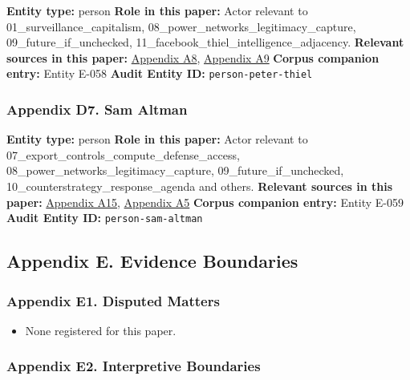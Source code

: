 \documentclass[
  american,
  11pt,
  letterpaper,
]{article}
\providecommand{\tightlist}{%
  \setlength{\itemsep}{0pt}\setlength{\parskip}{0pt}}
\begin{document}
\textbf{Entity type:} person \textbf{Role in this paper:} Actor relevant
to 01\_surveillance\_capitalism,
08\_power\_networks\_legitimacy\_capture, 09\_future\_if\_unchecked,
11\_facebook\_thiel\_intelligence\_adjacency. \textbf{Relevant sources
in this paper:}
\hyperref[appendix-a8-why-silicon-valley-billionaires-are-prepping-for-the-apocalypse-in-new-zealand]{Appendix
A8},
\hyperref[appendix-a9-new-zealand-woos-the-wealthy-with-golden-visa-changes]{Appendix
A9} \textbf{Corpus companion entry:} Entity E-058 \textbf{Audit Entity
ID:} \texttt{person-peter-thiel}

\subsubsection{Appendix D7. Sam Altman}\label{appendix-d7-sam-altman}

\textbf{Entity type:} person \textbf{Role in this paper:} Actor relevant
to 07\_export\_controls\_compute\_defense\_access,
08\_power\_networks\_legitimacy\_capture, 09\_future\_if\_unchecked,
10\_counterstrategy\_response\_agenda and others. \textbf{Relevant
sources in this paper:}
\hyperref[appendix-a15-openais-proposals-for-the-us-ai-action-plan]{Appendix
A15}, \hyperref[appendix-a5-sam-altman-s-manifest-destiny]{Appendix A5}
\textbf{Corpus companion entry:} Entity E-059 \textbf{Audit Entity ID:}
\texttt{person-sam-altman}

\subsection{Appendix E. Evidence
Boundaries}\label{appendix-e.-evidence-boundaries}

\subsubsection{Appendix E1. Disputed
Matters}\label{appendix-e1-disputed-matters}

\begin{itemize}
\tightlist
\item
  None registered for this paper.
\end{itemize}

\subsubsection{Appendix E2. Interpretive
Boundaries}\label{appendix-e2-interpretive-boundaries}
\end{document}
